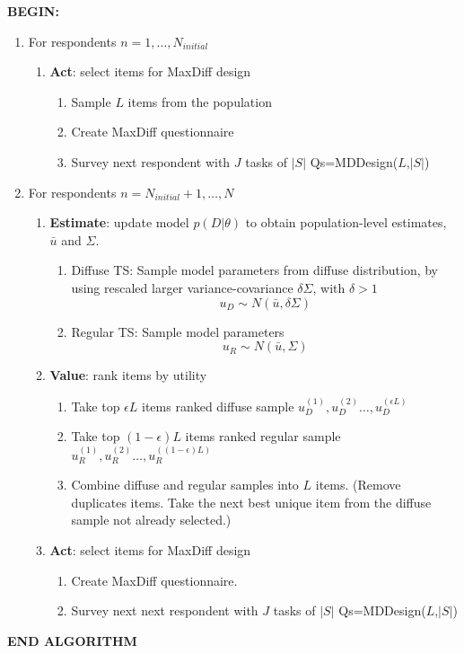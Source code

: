 \documentclass[nonblindrev]{informs3}
\begin{document}
\textbf{BEGIN:}
	\begin{enumerate}
		\item   For respondents $n =1,\ldots,N_{initial}$
		\begin{enumerate}
			\item \textbf{Act}: select items for MaxDiff design
			\begin{enumerate}
				\item Sample $L$ items from the population 
				\item Create MaxDiff questionnaire 
				\item Survey next respondent with $J$ tasks of $|S|$ Qs=MDDesign($L$,$|S|$)
			\end{enumerate}
		\end{enumerate}
		\item For respondents $n = N_{initial} + 1,\ldots, N$
		\begin{enumerate}
			\item \textbf{Estimate}: update model $p(D|\theta)$ to obtain population-level estimates, $\bar{u}$ and $\Sigma$.
			\begin{enumerate}
				\item Diffuse TS: Sample model parameters from diffuse distribution, by using rescaled larger variance-covariance $\delta \Sigma$, with $\delta > 1$ \[ u_D \sim N(\bar{u},\delta \Sigma)\]
				\item Regular TS: Sample model parameters \[u_R \sim N(\bar{u},\Sigma)\]
			\end{enumerate}
			\item \textbf{Value}: rank items by utility
			\begin{enumerate}
				\item Take top $\epsilon L$ items ranked diffuse sample $u_D^{(1)},u_D^{(2)}\ldots,u_D^{(\epsilon L)}$
				\item Take top $(1-\epsilon)L$ items ranked regular sample $u_R^{(1)},u_R^{(2)}\ldots,u_R^{((1-\epsilon)L)}$
				\item Combine diffuse and regular samples into $L$ items. (Remove duplicates items. Take the next best unique item from the diffuse sample not already selected.)
			\end{enumerate}
			\item \textbf{Act}: select items for MaxDiff design
			\begin{enumerate}
				\item Create MaxDiff questionnaire.
				\item Survey next next respondent with $J$ tasks of $|S|$ Qs=MDDesign($L$,$|S|$)
			\end{enumerate}
		\end{enumerate}
	\end{enumerate}
\textbf{END ALGORITHM}
\end{document}
